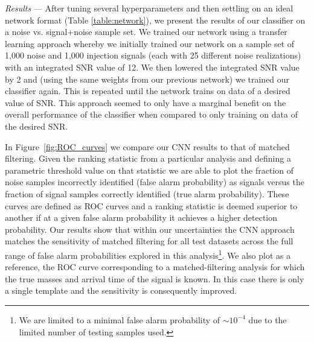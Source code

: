 \documentclass[%
showpacs,
 amsmath,amssymb,
 aps,
 twocolumn,
 prl,
 reprint,
floatfix,
]{revtex4-1}
\newcommand{\optsnr}{\rho_{\mathrm{opt}}}
\begin{document}
%
%
\textit{Results} --- After tuning several hyperparameters and then settling on
an ideal network format (Table \ref{table:network}), we present the results of
our classifier on a noise vs. signal+noise sample set. We trained our network
using a transfer learning approach whereby we initially trained our network on
a sample set of 1,000 noise and 1,000 injection signals (each with 25 different
noise realizations) with an integrated SNR value of 12. We then lowered the
integrated SNR value by 2 and (using the same weights from our previous
network) we trained our classifier again. This is repeated until the network trains on 
data of a desired value of SNR. This approach seemed to only have a marginal benefit 
on the overall performance of the classifier when compared to only training on data of 
the desired SNR.  

%
%

%
%
In Figure~\ref{fig:ROC_curves} we compare our \ac{CNN} results to that of
matched filtering. Given the ranking statistic from a particular analysis and
defining a parametric threshold value on that statistic we are able to plot
the fraction of noise samples incorrectly identified (false alarm probability) 
as signals versus the fraction of signal samples
correctly identified (true alarm probability). These curves
are defined as \ac{ROC} curves and a ranking statistic is deemed superior to
another if at a given false alarm probability it achieves a higher detection
probability. Our results show that within our uncertainties the \ac{CNN}
approach matches the sensitivity of matched filtering for all test datasets
across the full range of false alarm probabilities explored in this
analysis\footnote{We are limited to a minimal false alarm probability of $\sim
10^{-4}$ due to the limited number of testing samples used.}. We also plot as a
reference, the \ac{ROC} curve corresponding to a matched-filtering analysis for
which the true masses and arrival time of the signal is known. In this case
there is only a single template and the sensitivity is consequently improved.  
\end{document}
